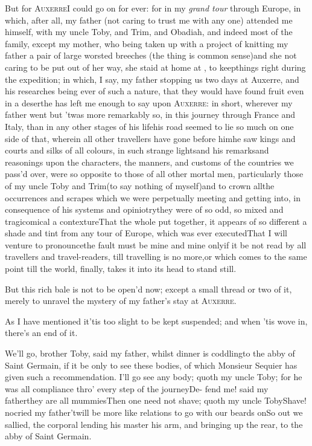 \documentclass{article}
\begin{document}
But for \textsc{Auxerre}\tsk I could go on for ever: for
in my \textit{grand tour} through Europe, in which, after all,
my father (not caring to trust me with any one) attended me
himself, with my uncle Toby, and Trim, and
Obadiah, and indeed most of the family, except my mother,
who being\pb
taken up with a project of knitting my father a pair of large worsted breeches\tsk
(the thing is common sense)\tsk and she not caring to be put out of her way, she
staid at home at , to keep\break things right during the expedition;
in which, I say, my father stopping us two days at Auxerre, and his researches being
ever of such a nature, that they would have found fruit even in a desert\tsh he has
left me enough to say upon \textsc{Auxerre}: in short, wherever my father went\tsh
but ’twas more remarkably so, in this journey through France and Italy, than in any
other stages of his life\tsk his road seemed to lie so much on one side of that,
wherein all other travellers have gone before him\tsk he saw kings and courts and
silks of all colours,\pb
in such strange lights\tsh and his remarks\break and reasonings upon the characters, the
manners, and customs of the countries we pass’d over, were so opposite to those of
all other mortal men, particularly those of my uncle Toby and Trim\tsk (to say
nothing of myself)\tsk and to crown all\tsk the occurrences and scrapes which we
were perpetually meeting and getting into, in consequence of his systems and
opiniotry\tsk they were of so odd, so mix\-ed and tragicomical a contexture\tsk That
the whole put together, it appears of so different a shade and tint from any tour of
Europe, which was ever executed\tsk That I will venture to pronounce\tsk the fault
must be mine and mine only\tsk if it be not read by all travellers and
travel-readers, till travelling is no more,\tsk or which comes to the same point\tsk
till the\pb
world, finally, takes it into its head to stand still.\tsh

\tsh But this rich bale is not to be open’d now;
except a small thread or two of it, merely to unravel the mystery
of my father’s stay at \textsc{Auxerre}.

\tsh As I have mentioned it\tsk ’tis too slight
to be kept suspended; and when ’tis wove in, there’s an end
of it.

We’ll go, brother Toby, said my father, whilst dinner is coddling\tsk to the\break
abby of Saint Germain, if it be only to see these bodies, of which Monsieur Se\-quier has
given such a recommendation.\break
\tsh I’ll go see any body; quoth my uncle Toby; for he
was all compliance thro’ every step of the journey\tsh De-\pb
fend me! said my father\tsk they are all mummies\tsk Then one need not shave; quoth
my uncle Toby\tsk Shave!  no\tsk\break cried my father\tsk ’twill be more like relations
to go with our beards on\tsk So out we sallied, the corporal lending his master his
arm, and bringing up the rear, to the abby of Saint Germain.
\end{document}

